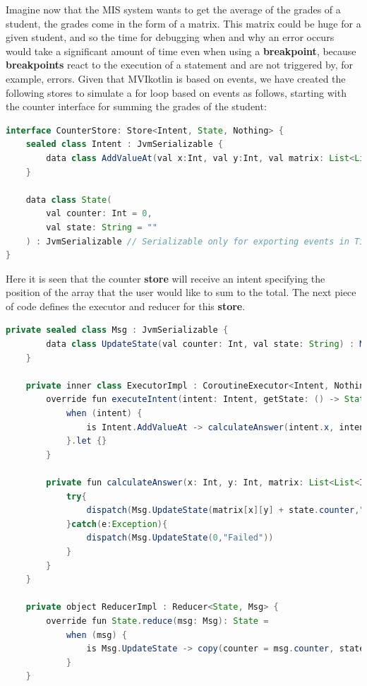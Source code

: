 Imagine now that the MIS system wants to get the average of the grades of a student, the grades come in the form of a matrix. This matrix could be huge for a given student, and so the time for debugging when and why an error occurs would take a significant amount of time even when using a \textbf{breakpoint}, because \textbf{breakpoints} react to the execution of a statement and are not triggered by, for example, errors. Given that MVIkotlin is based on events, we have created the following stores to simulate a for loop based on events as follows, starting with the counter interface for summing the grades of the student:

\begin{lstlisting}[language=java]
interface CounterStore: Store<Intent, State, Nothing> {
    sealed class Intent : JvmSerializable {
        data class AddValueAt(val x:Int, val y:Int, val matrix: List<List<Int>>, val state:State): Intent()
    }

    data class State(
        val counter: Int = 0,
        val state: String = ""
    ) : JvmSerializable // Serializable only for exporting events in Time Travel, no need otherwise.
}
\end{lstlisting}

Here it is seen that the counter \textbf{store} will receive an intent specifying the position of the array that the user would like to sum to the total. The next piece of code defines the executor and reducer for this \textbf{store}.

\begin{lstlisting}[language=java]
 private sealed class Msg : JvmSerializable {
        data class UpdateState(val counter: Int, val state: String) : Msg()
    }

    private inner class ExecutorImpl : CoroutineExecutor<Intent, Nothing, State, Msg, Nothing>() {
        override fun executeIntent(intent: Intent, getState: () -> State) {
            when (intent) {
                is Intent.AddValueAt -> calculateAnswer(intent.x, intent.y,intent.matrix, intent.state)
            }.let {}
        }

        private fun calculateAnswer(x: Int, y: Int, matrix: List<List<Int>>, state:State) {
            try{
                dispatch(Msg.UpdateState(matrix[x][y] + state.counter,"Successful") )
            }catch(e:Exception){
                dispatch(Msg.UpdateState(0,"Failed"))
            }
        }
    }

    private object ReducerImpl : Reducer<State, Msg> {
        override fun State.reduce(msg: Msg): State =
            when (msg) {
                is Msg.UpdateState -> copy(counter = msg.counter, state = msg.state)
            }
    }
\end{lstlisting}

